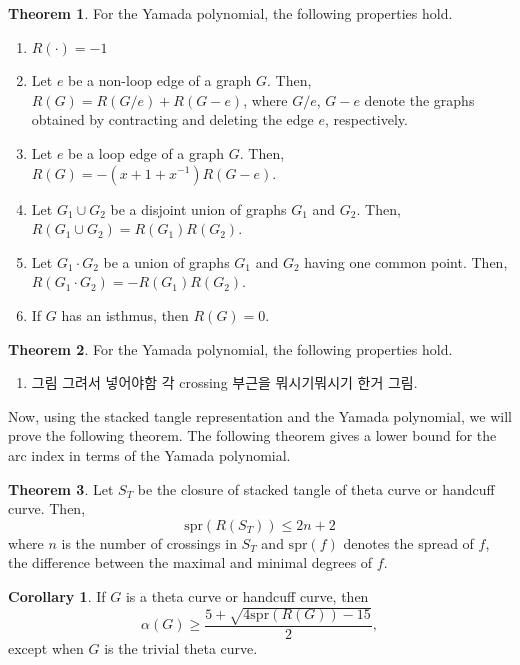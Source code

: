 \documentclass{article}
\theoremstyle{definition}
\theoremstyle{theorem}
\newtheorem{theorem}{Theorem}
\theoremstyle{proposition}
\theoremstyle{corollary}
\newtheorem*{corol}{Corollary}
\begin{document}
\begin{theorem}
    For the Yamada polynomial, the following properties hold.
    \begin{enumerate}
        \item $R( \cdot ) = -1$
        \item Let $e$ be a non-loop edge of a graph $G$. Then, $R(G) = R(G / e) + R(G - e)$, where $G/e$, $G-e$ denote the graphs obtained by contracting and deleting the edge $e$, respectively.
        \item Let $e$ be a loop edge of a graph $G$. Then, $R(G) = -(x+1+x^{-1}) R(G-e)$.
        \item Let $G_1 \cup G_2$ be a disjoint union of graphs $G_1$ and $G_2$. Then, $R(G_1 \cup G_2) = R(G_1)R(G_2)$.
        \item Let $G_1 \cdot G_2$ be a union of graphs $G_1$ and $G_2$ having one common point. Then, $R(G_1 \cdot G_2) = -R(G_1)R(G_2)$.
        \item If $G$ has an isthmus, then $R(G)=0$.
    \end{enumerate}
\end{theorem}

\begin{theorem}
    For the Yamada polynomial, the following properties hold.
    \begin{enumerate}
        \item 그림 그려서 넣어야함 각 crossing 부근을 뭐시기뭐시기 한거 그림.
    \end{enumerate}
\end{theorem}

Now, using the stacked tangle representation and the Yamada polynomial, we will prove the following theorem. The following theorem gives a lower bound for the arc index in terms of the Yamada polynomial.

\begin{theorem}
    Let $S_T$ be the closure of stacked tangle of theta curve or handcuff curve. Then,
    \[ \text{spr}(R(S_T)) \leq 2n+2 \]
    where $n$ is the number of crossings in $S_T$ and $\mathrm{spr}(f)$ denotes the spread of $f$, the difference between the maximal and minimal degrees of $f$.
\end{theorem}

\begin{corol}
    If $G$ is a theta curve or handcuff curve, then
    \[ \alpha(G) \geq \frac{5 + \sqrt{4 \mathrm{spr}(R(G)) - 15}}{2}, \]
    except when $G$ is the trivial theta curve.
\end{corol}
\end{document}
